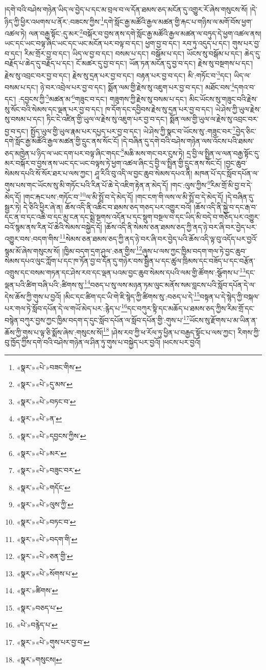 །དགེ་བའི་བཤེས་གཉེན་ཡིད་ལ་བྱེད་པ་དང་མ་བྲལ་བ་ལ་དོན་ཐམས་ཅད་མངོན་དུ་འགྱུར་རོ་ཞེས་གསུངས་སོ། །དེ་ཉིད་ཀྱི་ཕྱིར་འཕགས་པ་ནོར་:བཟངས་ཀྱིས་\footnote{«སྣར་»«པེ་»བཟང་གིས་}དགེ་སློང་རྒྱ་མཚོའི་རྒྱལ་མཚན་གྱི་རྐང་པ་གཉིས་ལ་མགོ་བོས་ཕྱག་འཚལ་ཏེ། ལན་བརྒྱ་སྟོང་:དུ་མར་\footnote{«སྣར་»«པེ་»དུ་མས་}བསྐོར་བ་བྱས་ནས་དགེ་སློང་རྒྱ་མཚོའི་རྒྱལ་མཚན་ལ་བཏུད་དེ་ཕྱག་འཚལ་ནས། ཡང་དང་ཡང་བལྟ་ཞིང་ཡང་དང་ཡང་མངོན་པར་བལྟ་བ་དང་། ཕྱག་བྱ་བ་དང་། རབ་ཏུ་འདུད་པ་དང་། གུས་པར་བྱ་བ་དང་། རིམ་གྲོར་བྱ་བ་དང་། ཡིད་ལ་བྱ་བ་དང་། བསམ་པ་དང་། བསྒོམ་པ་དང་། ཡོངས་སུ་བསྒོམ་པ་དང་། ཆེད་དུ་བརྗོད་པ་ཆེད་དུ་བརྗོད་པ་དང་། ངོ་མཚར་དུ་བྱ་བ་དང་། ཡོན་ཏན་མངོན་དུ་བྱ་བ་དང་། རྗེས་སུ་བསྔགས་པ་དང་། རྗེས་སུ་འབྲང་བར་བྱ་བ་དང་། རྗེས་སུ་དྲན་པར་བྱ་བ་དང་། བརྟན་པར་བྱ་བ་དང་། མི་:གཏོང་བ་\footnote{«སྣར་»«པེ་»བཏང་བ་}དང་། ཡིད་ལ་བསམ་པ་དང་། ཉེ་བར་འབྲེལ་པར་བྱ་བ་དང་། སྨོན་ལམ་གྱི་རྗེས་སུ་འཇུག་པར་བྱ་བ་དང་། མཐོང་བས་\footnote{«སྣར་»«པེ་»ན་}དགའ་བ་དང་། :དབྱངས་ཀྱི་\footnote{«སྣར་»«པེ་»དབྱངས་ཀྱིས་}མཚན་མ་\footnote{«སྣར་»«པེ་»མར་}གཟུང་བ་དང་། གཟུགས་ཀྱི་རྗེས་སུ་བསམ་པ་དང་། མིང་ཡོངས་སུ་གཟུང་བའི་རྗེས་སུ་སོང་བའི་སེམས་དང་ལྡན་པར་བྱ་བ་དང་། ཁ་དོག་དང་དབྱིབས་རྗེས་སུ་དྲན་པར་བྱ་བ་དང་། ཡེ་ཤེས་ཀྱི་ཡུལ་རྗེས་སུ་བསམ་པ་དང་། ཏིང་ངེ་འཛིན་གྱི་ཡུལ་ལ་རྗེས་སུ་འཇུག་པར་བྱ་བ་དང་། སྨོན་ལམ་གྱི་ཡུལ་ལ་རྗེས་སུ་འབྲང་བར་བྱ་བ་དང་། སྤྱོད་ཡུལ་གྱི་ཡུལ་རྣམ་པར་དཔྱད་པར་བྱ་བ་དང་། ཡེ་ཤེས་ཀྱི་སྣང་བ་ཡོངས་སུ་:གཟུང་བར་\footnote{«སྣར་»«པེ་»བཟུང་བར་}བྱེད་ཅིང་དགེ་སློང་རྒྱ་མཚོའི་རྒྱལ་མཚན་གྱི་དྲུང་ནས་སོང་ངོ། །དེ་བཞིན་དུ་དགེ་བའི་བཤེས་གཉེན་ལས་འོངས་པའི་ཐམས་ཅད་མཁྱེན་པ་ཉིད་ལ་ཡང་དག་པར་བལྟ་ཞིང་གདང་\footnote{«སྣར་»«པེ་»གདོང་}མཆི་མས་གང་བར་ངུས་ཏེ། དྲ་བྱི་ལ་སྤྲིན་ལ་ལན་བརྒྱ་སྟོང་དུ་མར་བསྐོར་བ་བྱས་ནས་ཡང་དང་ཡང་བལྟས་ཏེ་ཕྱག་འཚལ་ཞིང་དྲ་བྱི་ལ་སྤྲིན་གྱི་དྲུང་ནས་སོང་ངོ། །བྱང་ཆུབ་སེམས་དཔའི་སོ་སོར་ཐར་པ་ལས་ཀྱང་། ཤཱ་རིའི་བུ་འདི་ལ་བྱང་ཆུབ་སེམས་དཔའ་ནི། མཁན་པོ་དང་སློབ་དཔོན་ལ་གུས་པས་གང་ཡོངས་སུ་མི་གཏོང་པའི་རིན་པོ་ཆེ་དེ་འཇིག་རྟེན་ན་མེད་དོ། །གང་:ལུས་ཀྱིས་\footnote{«སྣར་»«པེ་»ལུས་ཀྱི་}རིམ་གྲོ་མི་བྱ་བ་དེ་མེད་དོ། །གང་རྐང་པས་:གཏོང་བ་\footnote{«སྣར་»«པེ་»བཏང་བ་}ལ་མི་སྤྲོ་བ་དེ་མེད་དོ། །གང་ངག་གི་ལས་ལ་མི་སྤྲོ་བ་དེ་མེད་དོ། །དེ་བཞིན་དུ་སྦྱར་ཏེ། དེ་ཅིའི་ཕྱིར་ཞེ་ན། ཆོས་འདི་ནི་འཆིང་བ་ཐམས་ཅད་གཅད་པར་འགྱུར་བའོ། །ཆོས་འདི་ནི་སྐྱེ་བ་དང་རྒ་བ་དང་ན་བ་དང་འཆི་བ་དང་མྱ་ངན་དང་སྨྲེ་སྔགས་འདོན་པ་དང་སྡུག་བསྔལ་བ་དང་ཡིད་མི་བདེ་བ་གཅོད་པར་འགྱུར་བའོ་སྙམ་ནས་རིན་པོ་ཆེའི་སེམས་བསྐྱེད་དོ། །ཆོས་འདི་ནི་སེམས་ཅན་ཐམས་ཅད་ཀྱི་ནད་ཉེ་བར་ཞི་བར་བྱེད་པར་འགྱུར་བས་:བདག་གིས་\footnote{«སྣར་»«པེ་»བདག་གི་}སེམས་ཅན་ཐམས་ཅད་ཀྱི་ནད་ཉེ་བར་ཞི་བར་བྱེད་པའི་ཆོས་འདི་ལྟ་བུ་འདོད་པར་བྱའོ་སྙམ་མོ་ཞེས་གསུངས་སོ། །ཁྱིམ་བདག་དྲག་ཤུལ་:ཅན་གྱིས་\footnote{«སྣར་»«པེ་»ཅན་གྱི་}ཞུས་པ་ལས་ཀྱང་ཁྱིམ་བདག་གལ་ཏེ་བྱང་ཆུབ་སེམས་དཔའ་ལུང་ཀློག་པ་དང་ཁ་ཏོན་བྱ་བ་དོན་དུ་གཉེར་བས་སྦྱིན་པ་དང་ཚུལ་ཁྲིམས་དང་བཟོད་པ་དང་བརྩོན་འགྲུས་དང་བསམ་གཏན་དང་ཤེས་རབ་དང་ལྡན་པའམ་བྱང་ཆུབ་སེམས་དཔའི་ལམ་གྱི་ཚོགས་:སྩོགས་པ་\footnote{«སྣར་»«པེ་»སོགས་པ་}དང་ལྡན་པའི་ཚིག་བཞི་པའི་:ཚིགས་སུ་\footnote{«སྣར་»ཚིགས་}བཅད་པ་སུ་ལས་མཉན་ཏམ་ལུང་མནོས་སམ་བླངས་པའི་སློབ་དཔོན་དེ་ལ་དེས་ཆོས་ཀྱི་གུས་པ་བྱའོ། །མིང་དང་ཚིག་དང་ཡི་གེ་ཇི་སྙེད་ཀྱི་ཚིགས་སུ་:བཅད་པ་དེ་\footnote{«སྣར་»བཅད་པ་}བསྟན་པ་དེ་སྙེད་ཀྱི་བསྐལ་པར་གལ་ཏེ་སློབ་དཔོན་དེ་ལ་གཡོ་མེད་པར་:རྙེད་པ་\footnote{«པེ་»བརྙེད་པ་}དང་བཀུར་སྟི་དང་མཆོད་པ་ཐམས་ཅད་ཀྱིས་རིམ་གྲོ་དང་བསྙེན་བཀུར་བྱས་ཀྱང་ཁྱིམ་བདག་ད་དུང་སློབ་དཔོན་ལ་སློབ་དཔོན་གྱི་:གུས་པ་\footnote{«སྣར་»«པེ་»གུས་པར་བྱ་བ་}ཡོངས་སུ་རྫོགས་པ་མ་ཡིན་ན་ཆོས་ཀྱི་གུས་པ་ལྟ་ཅི་སྨོས་ཞེས་:གསུངས་སོ།\footnote{«སྣར་»གསུངས།} །ཤེས་རབ་ཀྱི་ཕ་རོལ་ཏུ་ཕྱིན་པ་བརྒྱད་སྟོང་པ་ལས་ཀྱང་། རིགས་ཀྱི་བུ་ཁྱོད་ཀྱིས་དགེ་བའི་བཤེས་གཉེན་ལ་ཤིན་ཏུ་གུས་པ་བསྐྱེད་པར་བྱའོ། །ཕངས་པར་བྱའོ། 